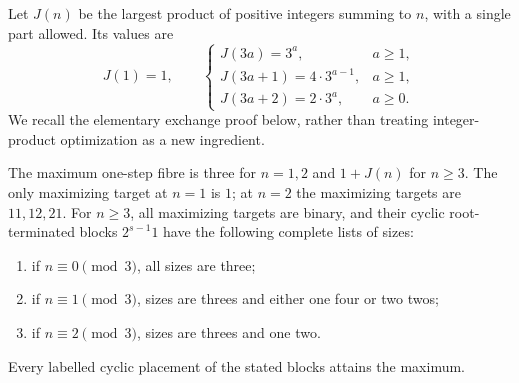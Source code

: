 Let $J(n)$ be the largest product of positive integers summing to $n$,
with a single part allowed. Its values are
\begin{equation}\label{eq:J}
 J(1)=1,\qquad
 \begin{cases}
 J(3a)=3^a,&a\ge1,\\
 J(3a+1)=4\cdot3^{a-1},&a\ge1,\\
 J(3a+2)=2\cdot3^a,&a\ge0.
 \end{cases}
\end{equation}
We recall the elementary exchange proof below, rather than treating
integer-product optimization as a new ingredient.

\begin{theorem}\label{thm:extreme}
The maximum one-step fibre is three for $n=1,2$ and $1+J(n)$ for $n\ge3$.
The only maximizing target at $n=1$ is $1$; at $n=2$ the maximizing
targets are $11,12,21$. For $n\ge3$, all maximizing targets are binary,
and their cyclic root-terminated blocks $2^{s-1}1$ have the following
complete lists of sizes:
\begin{enumerate}
\item if $n\equiv0\pmod3$, all sizes are three;
\item if $n\equiv1\pmod3$, sizes are threes and either one four or two twos;
\item if $n\equiv2\pmod3$, sizes are threes and one two.
\end{enumerate}
Every labelled cyclic placement of the stated blocks attains the maximum.
\end{theorem}
